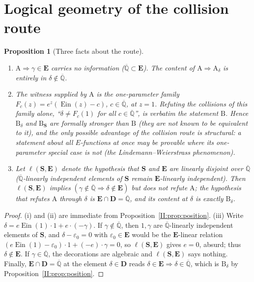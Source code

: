 \documentclass[11pt,a4paper]{article}
\newcommand{\Qbar}{\overline{\mathbb Q}}
\newcommand{\Ein}{\operatorname{Ein}}
\newcommand{\EE}{\mathbf E}
\newcommand{\DD}{\mathbf D}
\newcommand{\Sring}{\mathbf S}
\newtheorem{proposition}[theorem]{Proposition}
\theoremstyle{definition}
\theoremstyle{remark}
\numberwithin{equation}{section}
\begin{document}
\section{Logical geometry of the collision route}\label{II:sec:geometry}

\begin{proposition}[Three facts about the route]\label{II:prop:geometry}
\begin{enumerate}[label=(\roman*)]
\item $\mathrm A\Rightarrow\gamma\in\EE$ carries no information ($\Qbar\subset\EE$). The
content of $\mathrm A\Rightarrow\mathrm A_\delta$ is entirely in $\delta\notin\Qbar$.
\item The witness supplied by $\mathrm A$ is the one-parameter family
$F_c(z)=e^z(\Ein(z)-c)$, $c\in\Qbar$, at $z=1$. Refuting the collisions of this family alone,
``$\delta\ne F_c(1)$ for all $c\in\Qbar$'', is verbatim the statement $\mathrm B$. Hence
$\mathrm B_\delta$ and $\mathrm B_{\Sring}$ are formally stronger than $\mathrm B$ (they are
not known to be equivalent to it), and the only possible advantage of the collision route is
structural: a statement about all $E$-functions at once may be provable where its
one-parameter special case is not (the Lindemann--Weierstrass phenomenon).
\item Let $\ell(\Sring,\EE)$ denote the hypothesis that $\Sring$ and $\EE$ are linearly
disjoint over $\Qbar$ ($\Qbar$-linearly independent elements of $\Sring$ remain
$\EE$-linearly independent). Then $\ell(\Sring,\EE)$ implies
$(\gamma\notin\Qbar\Rightarrow\delta\notin\EE)$ but does \emph{not} refute $\mathrm A$;
the hypothesis that refutes $\mathrm A$ through $\delta$ is $\EE\cap\DD=\Qbar$, and its
content at $\delta$ is exactly $\mathrm B_\delta$.
\end{enumerate}
\end{proposition}
\begin{proof}
(i) and (ii) are immediate from Proposition~\ref{II:prop:position}. (iii) Write
$\delta=e\Ein(1)\cdot1+e\cdot(-\gamma)$. If $\gamma\notin\Qbar$, then $1,\gamma$ are
$\Qbar$-linearly independent elements of $\Sring$, and $\delta-\varepsilon_0=0$ with
$\varepsilon_0\in\EE$ would be the $\EE$-linear relation
$(e\Ein(1)-\varepsilon_0)\cdot1+(-e)\cdot\gamma=0$, so $\ell(\Sring,\EE)$ gives $e=0$,
absurd; thus $\delta\notin\EE$. If $\gamma\in\Qbar$, the decorations are algebraic and
$\ell(\Sring,\EE)$ says nothing. Finally, $\EE\cap\DD=\Qbar$ at the element $\delta\in\DD$
reads $\delta\in\EE\Rightarrow\delta\in\Qbar$, which is $\mathrm B_\delta$ by
Proposition~\ref{II:prop:position}.
\end{proof}
\end{document}
